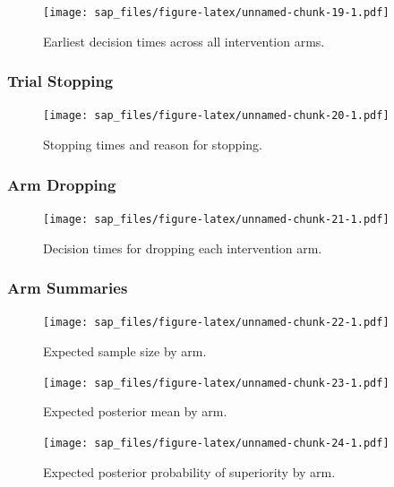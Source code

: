 \documentclass[
  bibliography=totoc]{scrreprt}
\begin{document}
\begin{figure}
\centering
\texttt{[image: sap\_files/figure-latex/unnamed-chunk-19-1.pdf]}
\caption{\label{fig:unnamed-chunk-19}Earliest decision times across all intervention arms.}
\end{figure}

\clearpage

\hypertarget{trial-stopping-1}{%
\subsubsection{Trial Stopping}\label{trial-stopping-1}}

\begin{figure}
\centering
\texttt{[image: sap\_files/figure-latex/unnamed-chunk-20-1.pdf]}
\caption{\label{fig:unnamed-chunk-20}Stopping times and reason for stopping.}
\end{figure}

\clearpage

\hypertarget{arm-dropping-1}{%
\subsubsection{Arm Dropping}\label{arm-dropping-1}}

\begin{figure}
\centering
\texttt{[image: sap\_files/figure-latex/unnamed-chunk-21-1.pdf]}
\caption{\label{fig:unnamed-chunk-21}Decision times for dropping each intervention arm.}
\end{figure}

\clearpage

\hypertarget{arm-summaries-1}{%
\subsubsection{Arm Summaries}\label{arm-summaries-1}}

\begin{figure}
\centering
\texttt{[image: sap\_files/figure-latex/unnamed-chunk-22-1.pdf]}
\caption{\label{fig:unnamed-chunk-22}Expected sample size by arm.}
\end{figure}

\begin{figure}
\centering
\texttt{[image: sap\_files/figure-latex/unnamed-chunk-23-1.pdf]}
\caption{\label{fig:unnamed-chunk-23}Expected posterior mean by arm.}
\end{figure}

\begin{figure}
\centering
\texttt{[image: sap\_files/figure-latex/unnamed-chunk-24-1.pdf]}
\caption{\label{fig:unnamed-chunk-24}Expected posterior probability of superiority by arm.}
\end{figure}
\end{document}
